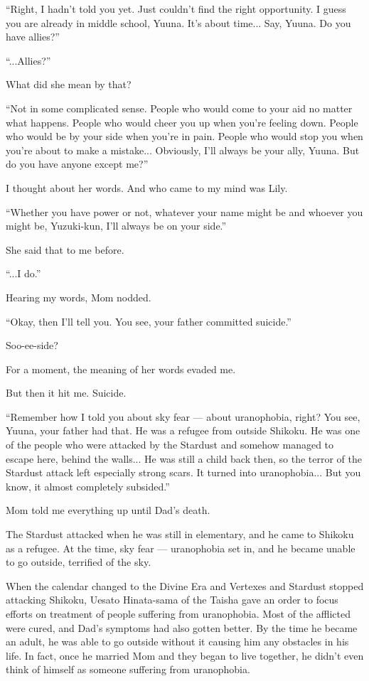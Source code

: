 ``Right, I hadn't told you yet. Just couldn't find the right opportunity. I guess you are already in middle school, Yuuna. It's about time... Say, Yuuna. Do you have allies?''

``...Allies?''

What did she mean by that?

``Not in some complicated sense. People who would come to your aid no matter what happens. People who would cheer you up when you're feeling down. People who would be by your side when you're in pain. People who would stop you when you're about to make a mistake... Obviously, I'll always be your ally, Yuuna. But do you have anyone except me?''

I thought about her words. And who came to my mind was Lily.

``Whether you have power or not, whatever your name might be and whoever you might be, Yuzuki-kun, I'll always be on your side.''

She said that to me before.

``...I do.''

Hearing my words, Mom nodded.

``Okay, then I'll tell you. You see, your father committed suicide.''

Soo-ee-side?

For a moment, the meaning of her words evaded me.

But then it hit me. Suicide.

``Remember how I told you about sky fear --- about uranophobia, right? You see, Yuuna, your father had that. He was a refugee from outside Shikoku. He was one of the people who were attacked by the Stardust and somehow managed to escape here, behind the walls... He was still a child back then, so the terror of the Stardust attack left especially strong scars. It turned into uranophobia... But you know, it almost completely subsided.''

Mom told me everything up until Dad's death.

The Stardust attacked when he was still in elementary, and he came to Shikoku as a refugee. At the time, sky fear --- uranophobia set in, and he became unable to go outside, terrified of the sky.

When the calendar changed to the Divine Era and Vertexes and Stardust stopped attacking Shikoku, Uesato Hinata-sama of the Taisha gave an order to focus efforts on treatment of people suffering from uranophobia. Most of the afflicted were cured, and Dad's symptoms had also gotten better. By the time he became an adult, he was able to go outside without it causing him any obstacles in his life. In fact, once he married Mom and they began to live together, he didn't even think of himself as someone suffering from uranophobia.

